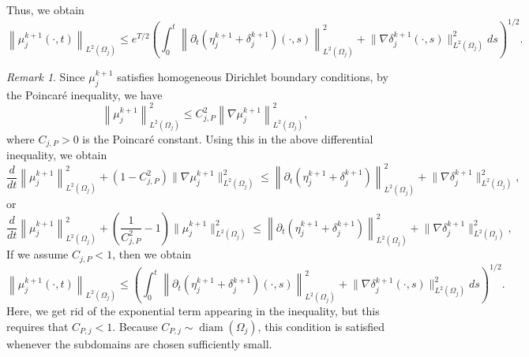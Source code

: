 \documentclass[a4paper, 11pt]{article}
\theoremstyle{remark}
\newtheorem{remark}[equation]{Remark}
\begin{document}
Thus, we obtain
\begin{equation*}
    \boxed{
    \left\lVert \mu_{j}^{k+1}(\cdot, t)\right\rVert_{L^{2}(\Omega_{j})} \leq e^{T/2}\left(\int_{0}^{t}\left\lVert \partial_{t}\left(\eta_{j}^{k+1} + \delta_{j}^{k+1}\right)(\cdot, s)\right\rVert^{2}_{L^{2}(\Omega_{j})} + \lVert \nabla \delta_{j}^{k+1}(\cdot, s)\rVert^{2}_{L^{2}(\Omega_{j})}ds\right)^{1/2}}.
\end{equation*}
\begin{remark}
Since $\mu_{j}^{k+1}$ satisfies homogeneous Dirichlet boundary conditions, by the Poincaré inequality, we have
\begin{equation*}
    \left\lVert \mu_{j}^{k+1}\right\rVert^{2}_{L^{2}(\Omega_{j})} \leq C_{j, P}^{2}\left\lVert \nabla\mu_{j}^{k+1}\right\rVert^{2}_{L^{2}(\Omega_{j})},
\end{equation*}
where $C_{j, P}>0$ is the Poincaré constant. Using this in the above differential inequality, we obtain
\begin{equation*}
    \dfrac{d}{dt}\left\lVert \mu_{j}^{k+1}\right\rVert^{2}_{L^{2}(\Omega_{j})} + \left(1 - C_{j, P}^{2}\right)\lVert \nabla \mu_{j}^{k+1}\rVert^{2}_{L^{2}(\Omega_{j})} \leq \left\lVert \partial_{t}\left(\eta_{j}^{k+1} + \delta_{j}^{k+1}\right)\right\rVert^{2}_{L^{2}(\Omega_{j})} + \lVert \nabla \delta_{j}^{k+1}\rVert^{2}_{L^{2}(\Omega_{j})},
\end{equation*}
or 
\begin{equation*}
    \dfrac{d}{dt}\left\lVert \mu_{j}^{k+1}\right\rVert^{2}_{L^{2}(\Omega_{j})} + \left(\dfrac{1}{C_{j, P}^{2}} - 1\right)\lVert \mu_{j}^{k+1}\rVert^{2}_{L^{2}(\Omega_{j})} \leq \left\lVert \partial_{t}\left(\eta_{j}^{k+1} + \delta_{j}^{k+1}\right)\right\rVert^{2}_{L^{2}(\Omega_{j})} + \lVert \nabla \delta_{j}^{k+1}\rVert^{2}_{L^{2}(\Omega_{j})},
\end{equation*}
If we assume $C_{j, P}<1$, then we obtain
\begin{equation*}
    \left\lVert \mu_{j}^{k+1}(\cdot, t)\right\rVert_{L^{2}(\Omega_{j})} \leq \left(\int_{0}^{t}\left\lVert \partial_{t}\left(\eta_{j}^{k+1} + \delta_{j}^{k+1}\right)(\cdot, s)\right\rVert^{2}_{L^{2}(\Omega_{j})} + \lVert \nabla \delta_{j}^{k+1}(\cdot, s)\rVert^{2}_{L^{2}(\Omega_{j})}ds\right)^{1/2}.
\end{equation*}
Here, we get rid of the exponential term appearing in the inequality, but this requires that $C_{P,j} < 1$. Because $C_{P,j} \sim \operatorname{diam}(\Omega_j)$, this condition is satisfied whenever the subdomains are chosen sufficiently small.
\end{remark}
\end{document}
